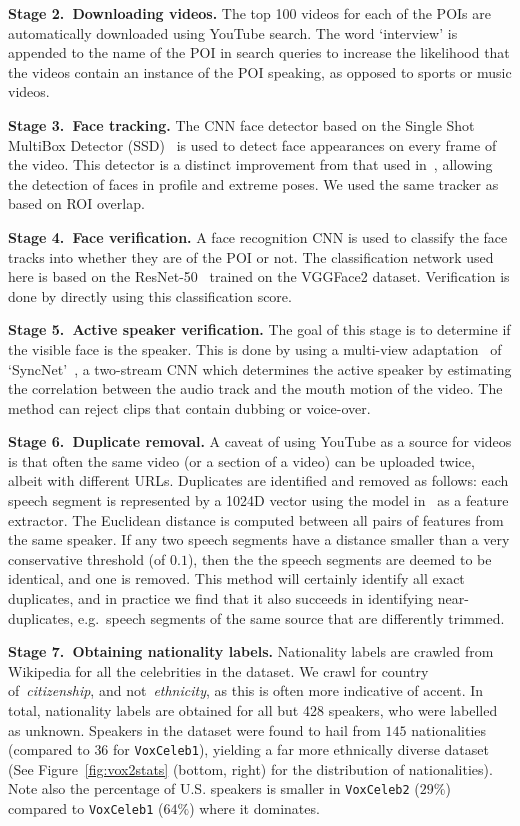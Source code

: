\documentclass[a4paper]{article}
\def\newpara{\vspace{2pt}}
\begin{document}
\newpara\noindent\textbf{Stage 2.\  Downloading videos.}
The top 100 videos for each of the POIs are automatically downloaded using YouTube search. The word `interview' is appended to the name of the POI in search queries to increase the likelihood that the videos contain an instance of the POI speaking, as opposed to sports or music videos. 

\newpara\noindent\textbf{Stage 3.\  Face tracking.}
The CNN face detector based on the
Single Shot MultiBox Detector (SSD)~\cite{Liu16}
is used to detect face appearances
 on every frame of the video. This detector is a distinct improvement  from that used in~\cite{Nagrani17}, allowing the detection of faces in profile and extreme poses. 
 We used the same tracker as~\cite{Nagrani17} based on ROI overlap.
 
\newpara\noindent\textbf{Stage 4.\  Face verification. }
A face recognition CNN is used to classify the face tracks into whether they are of the POI or not.
The classification network used here is based on the ResNet-50~\cite{He15} trained on the VGGFace2
dataset. Verification is done by directly using this
classification score. 

\newpara\noindent\textbf{Stage 5.\  Active speaker verification.}
The goal of this stage is to determine if the  visible face is the speaker. This is done by using a multi-view adaptation~\cite{Chung17a} of `SyncNet'~\cite{Chung16a,Chung18}, a two-stream CNN which determines the active speaker by estimating the correlation between the audio track and the mouth motion of the video. The method can reject clips that contain dubbing or voice-over. 

\newpara\noindent\textbf{Stage 6.\  Duplicate removal. } 
A caveat of using YouTube as a source for videos is that often the
same video (or a section of a video) can be uploaded twice, albeit
with different URLs. Duplicates are identified and removed as follows:
each speech segment  is represented by a  1024D  vector using
the model in~\cite{Nagrani17} as a feature extractor.
The Euclidean distance is computed between all pairs of 
features from the same speaker. If any two speech segments  have a
distance smaller than a very conservative threshold (of $0.1$), then the 
the speech segments are deemed to be identical, and one is removed. This method will certainly
identify all exact duplicates, and in practice we find that it also succeeds in identifying near-duplicates,
e.g.\ speech segments of the same source that are differently trimmed. 

\newpara\noindent\textbf{Stage 7.\  Obtaining nationality labels. } 
Nationality labels are crawled from Wikipedia for all the celebrities
in the dataset. We crawl for country of~\textit{citizenship}, and
not~\textit{ethnicity}, as this is often more indicative of accent. In
total,  nationality labels are obtained for all but 428 speakers, who
were labelled as unknown. Speakers in the dataset were found to hail
from $145$ nationalities (compared to $36$ for { \tt VoxCeleb1}),
yielding a far more ethnically diverse dataset (See
Figure~\ref{fig:vox2stats} (bottom, right) for the distribution of
nationalities). Note also the percentage of U.S. speakers is smaller in
{ \tt VoxCeleb2} ($29\%$) compared to { \tt VoxCeleb1} ($64\%$) where
it dominates. 
\end{document}

